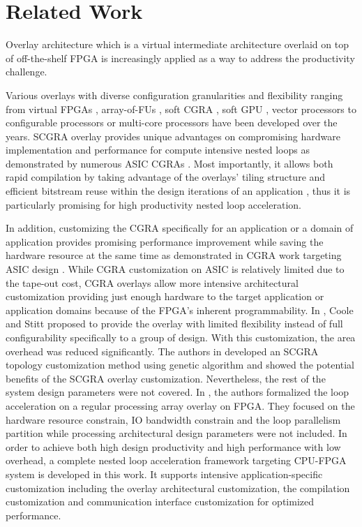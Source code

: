 \section{Related Work} \label{sec:relatedwork}
Overlay architecture which is a virtual intermediate architecture overlaid on 
top of off-the-shelf FPGA is increasingly applied as a way to address the 
productivity challenge. 

Various overlays with diverse configuration granularities and flexibility 
ranging from virtual FPGAs \cite{Grant2011Malibu, ZUMA2012, Coole2010Intermediate}, 
array-of-FUs \cite{mesh-FUs,ferreira2011fpga,dspoverlay}, soft 
CGRA \cite{kissler2006dynamically, scgra}, soft GPU \cite{Guppy2012GPU-Like}, 
vector processors\cite{Yiannacouras2009FPS, MXP2013} to 
configurable processors or multi-core processors \cite{unnikrishnan2009application, 
MARC2010, Yiannacouras2007Exploration, Capalija2009coarse-grain, OCTAVO2012, iDEA2012} 
have been developed over the years. SCGRA overlay provides unique 
advantages on compromising hardware implementation 
and performance for compute intensive nested loops as demonstrated 
by numerous ASIC CGRAs \cite{tessier2001reconfigurable, compton2002reconfigurable}.
Most importantly, it allows both rapid compilation by taking advantage of 
the overlays' tiling structure \cite{ROB2015} and efficient bitstream 
reuse within the design iterations of an application \cite{scgra}, 
thus it is particularly promising for high productivity nested loop acceleration.

In addition, customizing the CGRA specifically for an application or a domain of application
provides promising performance improvement while saving the hardware resource at the same time as
demonstrated in CGRA work targeting ASIC design \cite{totem, zhou2014application, miniskar2014retargetable}. 
While CGRA customization on ASIC is relatively limited due to the tape-out cost, CGRA overlays
allow more intensive architectural customization providing just enough hardware
to the target application or application domains because of the FPGA's inherent programmability. 
In \cite{adjustable2015}, Coole and Stitt proposed to provide the overlay with limited flexibility
instead of full configurability specifically to a group of design. With this customization, the area
overhead was reduced significantly. The authors in \cite{Lin:2012:EDC:2460216.2460227} developed an SCGRA topology
customization method using genetic algorithm and showed the potential benefits of the SCGRA overlay
customization. Nevertheless, the rest of the system design parameters were not covered. In \cite{BondhugulaRS07},
the authors formalized the loop acceleration on a regular processing array overlay on FPGA. They
focused on the hardware resource constrain, IO bandwidth constrain and the loop parallelism partition while
processing architectural design parameters were not included.
In order to achieve both high design productivity and high performance with low overhead,  
a complete nested loop acceleration framework targeting CPU-FPGA system 
is developed in this work. It supports intensive application-specific
customization including the overlay architectural customization, 
the compilation customization and communication interface customization 
for optimized performance.  

